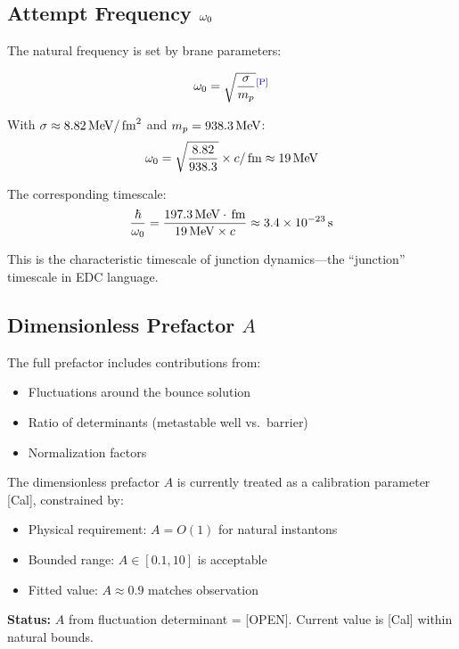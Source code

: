 \subsection{Attempt Frequency $\omega_0$}

The natural frequency is set by brane parameters:

\begin{derivationbox}[title=Attempt Frequency]
\begin{equation}
    \omegaz = \sqrt{\frac{\bsigma}{m_p}}
    \label{eq:omega0}
    \tagP
\end{equation}

With $\sigma \approx 8.82\,\mathrm{MeV}/\,\mathrm{fm}^2$ and $m_p = 938.3\,\mathrm{MeV}$:
\begin{equation}
    \omega_0 = \sqrt{\frac{8.82}{938.3}} \times c/\,\mathrm{fm} \approx 19\,\mathrm{MeV}
\end{equation}
\end{derivationbox}

The corresponding timescale:
\begin{equation}
    \frac{\hbar}{\omega_0} = \frac{197.3\,\mathrm{MeV}\cdot\,\mathrm{fm}}{19\,\mathrm{MeV} \times c}
                         \approx 3.4 \times 10^{-23}\,\mathrm{s}
    \label{eq:hbar_omega}
\end{equation}

This is the characteristic timescale of junction dynamics---the ``junction''
timescale in EDC language.

\subsection{Dimensionless Prefactor $A$}

The full prefactor includes contributions from:
\begin{itemize}
    \item Fluctuations around the bounce solution
    \item Ratio of determinants (metastable well vs.\ barrier)
    \item Normalization factors
\end{itemize}

\begin{edcopenbox}[title=Prefactor Status]
    The dimensionless prefactor $A$ is currently treated as a calibration
    parameter [Cal], constrained by:
    \begin{itemize}
        \item Physical requirement: $A = O(1)$ for natural instantons
        \item Bounded range: $A \in [0.1, 10]$ is acceptable
        \item Fitted value: $A \approx 0.9$ matches observation
    \end{itemize}

    \textbf{Status:} $A$ from fluctuation determinant = [OPEN].
    Current value is [Cal] within natural bounds.
    \tagOpen
\end{edcopenbox}

